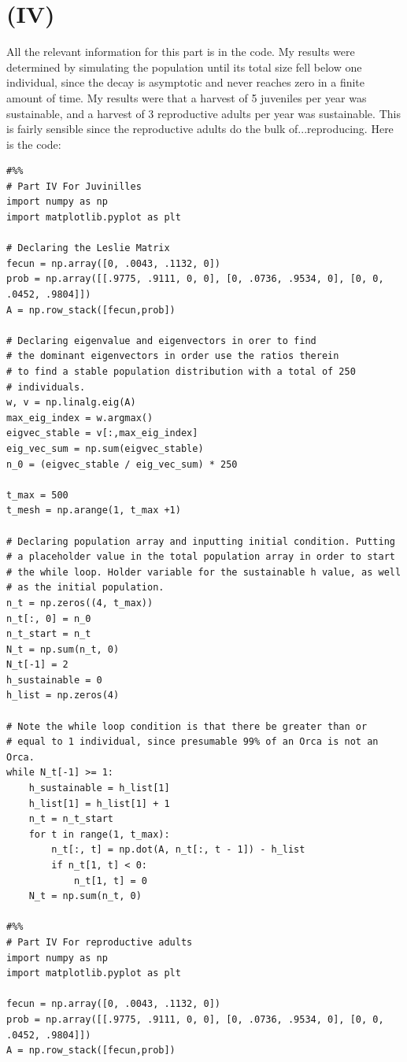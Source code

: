 \documentclass{article}
\begin{document}
\section*{\textbf{(IV)}}
All the relevant information for this part is in the code. My results were determined by simulating the population until its total size fell below one individual, since the decay is asymptotic and never reaches zero in a finite amount of time. My results were that a harvest of 5 juveniles per year was sustainable, and a harvest of 3 reproductive adults per year was sustainable. This is fairly sensible since the reproductive adults do the bulk of...reproducing. Here is the code:
\begin{lstlisting}
#%%
# Part IV For Juvinilles
import numpy as np
import matplotlib.pyplot as plt

# Declaring the Leslie Matrix
fecun = np.array([0, .0043, .1132, 0])
prob = np.array([[.9775, .9111, 0, 0], [0, .0736, .9534, 0], [0, 0, .0452, .9804]])
A = np.row_stack([fecun,prob])

# Declaring eigenvalue and eigenvectors in orer to find
# the dominant eigenvectors in order use the ratios therein
# to find a stable population distribution with a total of 250
# individuals.
w, v = np.linalg.eig(A)
max_eig_index = w.argmax()
eigvec_stable = v[:,max_eig_index]
eig_vec_sum = np.sum(eigvec_stable)
n_0 = (eigvec_stable / eig_vec_sum) * 250

t_max = 500
t_mesh = np.arange(1, t_max +1)

# Declaring population array and inputting initial condition. Putting
# a placeholder value in the total population array in order to start
# the while loop. Holder variable for the sustainable h value, as well
# as the initial population.
n_t = np.zeros((4, t_max))
n_t[:, 0] = n_0
n_t_start = n_t
N_t = np.sum(n_t, 0)
N_t[-1] = 2
h_sustainable = 0
h_list = np.zeros(4)

# Note the while loop condition is that there be greater than or
# equal to 1 individual, since presumable 99% of an Orca is not an Orca.
while N_t[-1] >= 1:
    h_sustainable = h_list[1]
    h_list[1] = h_list[1] + 1
    n_t = n_t_start
    for t in range(1, t_max):
        n_t[:, t] = np.dot(A, n_t[:, t - 1]) - h_list
        if n_t[1, t] < 0:
            n_t[1, t] = 0
    N_t = np.sum(n_t, 0)

#%%
# Part IV For reproductive adults
import numpy as np
import matplotlib.pyplot as plt

fecun = np.array([0, .0043, .1132, 0])
prob = np.array([[.9775, .9111, 0, 0], [0, .0736, .9534, 0], [0, 0, .0452, .9804]])
A = np.row_stack([fecun,prob])


\end{lstlisting}
\end{document}
